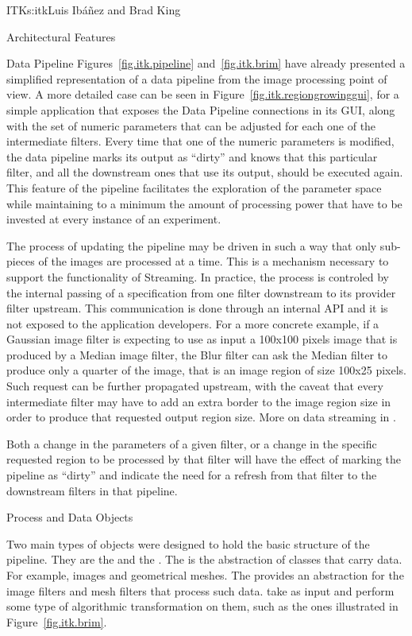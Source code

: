 \begin{aosachapter}{ITK}{s:itk}{Luis Ib\'{a}\~{n}ez and Brad King}
\begin{aosasect1}{Architectural Features}
\begin{aosasect2}{Data Pipeline}
Figures~\ref{fig.itk.pipeline} and~\ref{fig.itk.brim} have already presented a
simplified representation of a data pipeline from the image processing point of
view. A more detailed case can be seen in
Figure~\ref{fig.itk.regiongrowinggui}, for a simple application that exposes
the Data Pipeline connections in its GUI, along with the set of numeric
parameters that can be adjusted for each one of the intermediate filters. Every
time that one of the numeric parameters is modified, the data pipeline marks
its output as ``dirty'' and knows that this particular filter, and all the
downstream ones that use its output, should be executed again. This feature of
the pipeline facilitates the exploration of the parameter space while
maintaining to a minimum the amount of processing power that have to be
invested at every instance of an experiment.

The process of updating the pipeline may be driven in such a way that only
sub-pieces of the images are processed at a time. This is a mechanism necessary
to support the functionality of Streaming. In practice, the process is
controled by the internal passing of a  specification
from one filter downstream to its provider filter upstream. This communication
is done through an internal API and it is not exposed to the application
developers. For a more concrete example, if a Gaussian image filter is
expecting to use as input a 100x100 pixels image that is produced by a Median
image filter, the Blur filter can ask the Median filter to produce only a
quarter of the image, that is an image region of size 100x25 pixels.  Such
request can be further propagated upstream, with the caveat that every
intermediate filter may have to add an extra border to the image region size in
order to produce that requested output region size.
More on data streaming in .

Both a change in the parameters of a given filter, or a change in the
specific requested region to be processed by that filter will have the
effect of marking the pipeline as ``dirty'' and indicate the need for
a refresh from that filter to the downstream filters in that pipeline.

\begin{aosasect3}{Process and Data Objects}

Two main types of objects were designed to hold the basic structure of the
pipeline.  They are the  and the . The
 is the abstraction of classes that carry data. For example,
images and geometrical meshes. The  provides an abstraction
for the image filters and mesh filters that process such data.
 take  as input and perform some type of
algorithmic transformation on them, such as the ones illustrated in
Figure~\ref{fig.itk.brim}.


\end{aosasect3}
\end{aosasect2}
\end{aosasect1}
\end{aosachapter}
